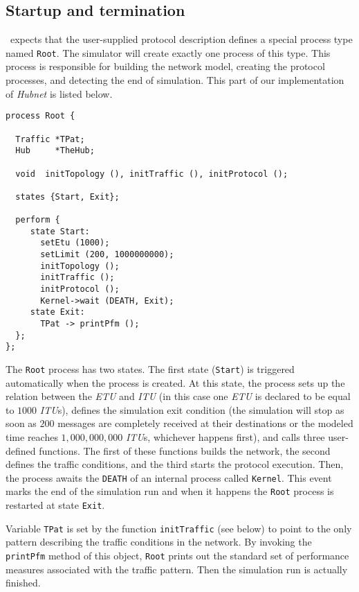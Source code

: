 \subsection{Startup and termination}

\smurph\ expects that the user-supplied protocol description defines a special
process type named {\tt Root}.
The simulator will create exactly one process of this type.
This process is responsible for building the network model,
creating the protocol processes, and detecting the end of simulation.
This part of our implementation of {\em Hubnet\/} is listed below.
{\small
\begin{verbatim}
process Root {

  Traffic *TPat;
  Hub     *TheHub;

  void  initTopology (), initTraffic (), initProtocol ();

  states {Start, Exit};

  perform {
     state Start:
       setEtu (1000);
       setLimit (200, 1000000000);
       initTopology ();
       initTraffic ();
       initProtocol ();
       Kernel->wait (DEATH, Exit);
     state Exit:
       TPat -> printPfm ();
  };
};
\end{verbatim} }

The {\tt Root} process has two states.
The first state ({\tt Start}) is triggered automatically when the process is
created.
At this state, the process sets up the relation between the {\em ETU\/} and
{\em ITU\/} (in this case one {\em ETU\/} is declared to be equal to $1000$
{\em ITU\/}s), defines the simulation exit condition (the simulation will stop
as soon as $200$ messages are completely received at their destinations or
the modeled time reaches $1,000,000,000$ {\em ITU}s, whichever happens first),
and calls three user-defined functions.
The first of these functions builds the network, the second defines
the traffic conditions, and the third starts the protocol execution.
Then, the process awaits the {\tt DEATH} of an internal process called
{\tt Kernel}.
This event marks the end of the simulation run and when it happens
the {\tt Root} process is restarted at state {\tt Exit}.

Variable {\tt TPat} is set
by the function {\tt initTraffic} (see below) to point
to the only pattern describing the traffic conditions in the network.
By invoking the {\tt printPfm} method of this object, {\tt Root} prints out
the standard set of performance measures associated with the traffic pattern.
Then the simulation run is actually finished.

